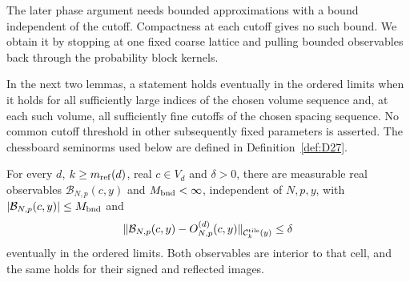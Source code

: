 The later phase argument needs bounded approximations with a bound independent of the cutoff. Compactness at each cutoff gives no such bound. We obtain it by stopping at one fixed coarse lattice and pulling bounded observables back through the probability block kernels.

In the next two lemmas, a statement holds eventually in the ordered limits when it holds for all sufficiently large indices of the chosen volume sequence and, at each such volume, all sufficiently fine cutoffs of the chosen spacing sequence. No common cutoff threshold in other subsequently fixed parameters is asserted. The chessboard seminorms used below are defined in Definition~\ref{def:D27}.
\begin{lemma}\label{lem:E-coarse-bounded}
For every $d$, $k\ge m_{\mathrm{ref}}(d)$, real $c\in V_d$ and $\delta>0$, there are measurable real observables $\mathcal B_{N,p}(c,y)$ and $M_{\rm bnd}<\infty$, independent of $N,p,y$, with $|\mathcal B_{N,p}(c,y)|\le M_{\rm bnd}$ and
\begin{equation*}
 \|\mathcal B_{N,p}(c,y)-O^{(d)}_{N,p}(c,y)\|_{\mathcal C^{\rm tile}_k(y)}\le\delta
\end{equation*}
eventually in the ordered limits. Both observables are interior to that cell, and the same holds for their signed and reflected images.
\end{lemma}
